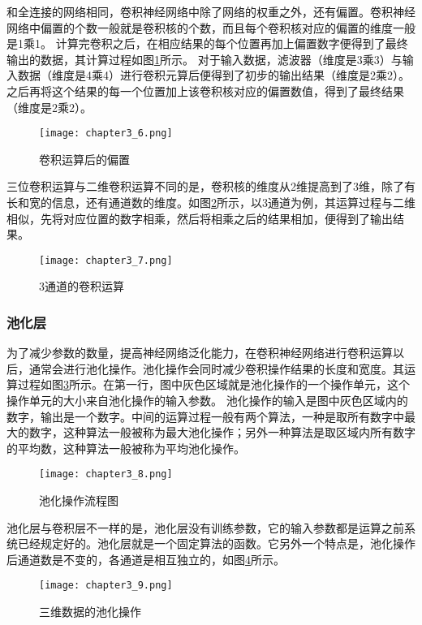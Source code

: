 和全连接的网络相同，卷积神经网络中除了网络的权重之外，还有偏置。卷积神经网络中偏置的个数一般就是卷积核的个数，而且每个卷积核对应的偏置的维度一般是1乘1。
计算完卷积之后，在相应结果的每个位置再加上偏置数字便得到了最终输出的数据，其计算过程如图\ref{fig:chapter3_6}所示。
对于输入数据，滤波器（维度是3乘3）与输入数据（维度是4乘4）进行卷积元算后便得到了初步的输出结果（维度是2乘2）。之后再将这个结果的每一个位置加上该卷积核对应的偏置数值，得到了最终结果（维度是2乘2）。
\begin{figure}
    \centering
    \texttt{[image: chapter3\_6.png]}
    \caption{卷积运算后的偏置\cite{luyujie_216}}
    \label{fig:chapter3_6}
\end{figure}

三位卷积运算与二维卷积运算不同的是，卷积核的维度从2维提高到了3维，除了有长和宽的信息，还有通道数的维度。如图\ref{fig:chapter3_7}所示，以3通道为例，其运算过程与二维相似，先将对应位置的数字相乘，然后将相乘之后的结果相加，便得到了输出结果。
\begin{figure}
    \centering
    \texttt{[image: chapter3\_7.png]}
    \caption{3通道的卷积运算\cite{luyujie_216}}
    \label{fig:chapter3_7}
\end{figure}
\subsubsection{池化层}
为了减少参数的数量，提高神经网络泛化能力，在卷积神经网络进行卷积运算以后，通常会进行池化操作。池化操作会同时减少卷积操作结果的长度和宽度。其运算过程如图\ref{fig:chapter3_8}所示。在第一行，图中灰色区域就是池化操作的一个操作单元，这个操作单元的大小来自池化操作的输入参数。
池化操作的输入是图中灰色区域内的数字，输出是一个数字。中间的运算过程一般有两个算法，一种是取所有数字中最大的数字，这种算法一般被称为最大池化操作；另外一种算法是取区域内所有数字的平均数，这种算法一般被称为平均池化操作。
\begin{figure}
    \centering
    \texttt{[image: chapter3\_8.png]}
    \caption{池化操作流程图\cite{luyujie_216}}
    \label{fig:chapter3_8}
\end{figure}

池化层与卷积层不一样的是，池化层没有训练参数，它的输入参数都是运算之前系统已经规定好的。池化层就是一个固定算法的函数。它另外一个特点是，池化操作后通道数是不变的，各通道是相互独立的，如图\ref{fig:chapter3_9}所示。
\begin{figure}
    \centering
    \texttt{[image: chapter3\_9.png]}
    \caption{三维数据的池化操作\cite{luyujie_216}}
    \label{fig:chapter3_9}
\end{figure}

